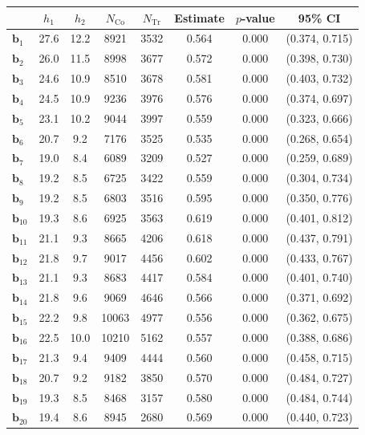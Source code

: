 \documentclass[10pt]{article}
\newcommand{\bb}{\mathbf{b}}
\begin{document}
\begin{table}[p]
    \centering
\begin{tabular}{lccccccc}
  \toprule\toprule
   & $h_1$ & $h_2$ & $N_{\mathrm{Co}}$ & $N_{\mathrm{Tr}}$ & Estimate & $p$-value & 95\% CI \\
  \midrule
   $\bb_{1}$ & 27.6 & 12.2 & 8921 & 3532 & 0.564 & 0.000 & (0.374, 0.715)\\
   $\bb_{2}$ & 26.0 & 11.5 & 8998 & 3677 & 0.572 & 0.000 & (0.398, 0.730)\\
   $\bb_{3}$ & 24.6 & 10.9 & 8510 & 3678 & 0.581 & 0.000 & (0.403, 0.732)\\
   $\bb_{4}$ & 24.5 & 10.9 & 9236 & 3976 & 0.576 & 0.000 & (0.374, 0.697)\\
   $\bb_{5}$ & 23.1 & 10.2 & 9044 & 3997 & 0.559 & 0.000 & (0.323, 0.666)\\
   $\bb_{6}$ & 20.7 & 9.2 & 7176 & 3525 & 0.535 & 0.000 & (0.268, 0.654)\\
   $\bb_{7}$ & 19.0 & 8.4 & 6089 & 3209 & 0.527 & 0.000 & (0.259, 0.689)\\
   $\bb_{8}$ & 19.2 & 8.5 & 6725 & 3422 & 0.559 & 0.000 & (0.304, 0.734)\\
   $\bb_{9}$ & 19.2 & 8.5 & 6803 & 3516 & 0.595 & 0.000 & (0.350, 0.776)\\
   $\bb_{10}$ & 19.3 & 8.6 & 6925 & 3563 & 0.619 & 0.000 & (0.401, 0.812)\\
   $\bb_{11}$ & 21.1 & 9.3 & 8665 & 4206 & 0.618 & 0.000 & (0.437, 0.791)\\
   $\bb_{12}$ & 21.8 & 9.7 & 9017 & 4456 & 0.602 & 0.000 & (0.433, 0.767)\\
   $\bb_{13}$ & 21.1 & 9.3 & 8683 & 4417 & 0.584 & 0.000 & (0.401, 0.740)\\
   $\bb_{14}$ & 21.8 & 9.6 & 9069 & 4646 & 0.566 & 0.000 & (0.371, 0.692)\\
   $\bb_{15}$ & 22.2 & 9.8 & 10063 & 4977 & 0.556 & 0.000 & (0.362, 0.675)\\
   $\bb_{16}$ & 22.5 & 10.0 & 10210 & 5162 & 0.557 & 0.000 & (0.388, 0.686)\\
   $\bb_{17}$ & 21.3 & 9.4 & 9409 & 4444 & 0.560 & 0.000 & (0.458, 0.715)\\
   $\bb_{18}$ & 20.7 & 9.2 & 9182 & 3850 & 0.570 & 0.000 & (0.484, 0.727)\\
   $\bb_{19}$ & 19.3 & 8.5 & 8468 & 3157 & 0.580 & 0.000 & (0.484, 0.744)\\
   $\bb_{20}$ & 19.4 & 8.6 & 8945 & 2680 & 0.569 & 0.000 & (0.440, 0.723)\\

\end{tabular}
\end{table}
\end{document}
